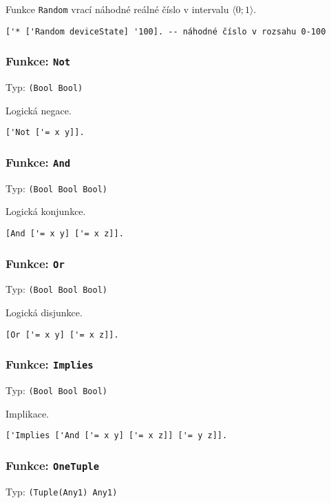 Funkce \lstinline{Random} vrací náhodné reálné číslo v intervalu $\bigl \langle 0; 1 \bigr \rangle$.

\begin{lstlisting}[caption={Ukázka využití Random}]
['* ['Random deviceState] '100]. -- náhodné číslo v rozsahu 0-100
\end{lstlisting}

\subsubsection*{Funkce: \lstinline{Not}}
Typ: \lstinline{(Bool Bool)}

Logická negace.

\begin{lstlisting}[caption={Ukázka využití Not}]
['Not ['= x y]].
\end{lstlisting}

\subsubsection*{Funkce: \lstinline{And}}
Typ: \lstinline{(Bool Bool Bool)}

Logická konjunkce.

\begin{lstlisting}[caption={Ukázka využití And}]
[And ['= x y] ['= x z]].
\end{lstlisting}

\subsubsection*{Funkce: \lstinline{Or}}
Typ: \lstinline{(Bool Bool Bool)}

Logická disjunkce.

\begin{lstlisting}[caption={Ukázka využití Or}]
[Or ['= x y] ['= x z]].
\end{lstlisting}

\subsubsection*{Funkce: \lstinline{Implies}}
Typ: \lstinline{(Bool Bool Bool)}

Implikace.

\begin{lstlisting}[caption={Ukázka využití Implies}]
['Implies ['And ['= x y] ['= x z]] ['= y z]].
\end{lstlisting}

\subsubsection*{Funkce: \lstinline{OneTuple}}
Typ: \lstinline{(Tuple(Any1) Any1)}

